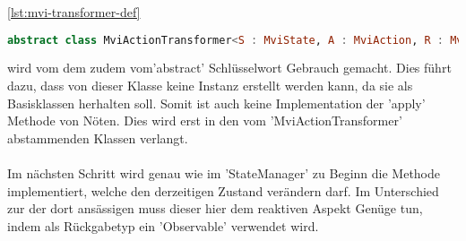 \ref{lst:mvi-transformer-def}
\begin{lstlisting}[caption={MviActionTransformer Definition}, label={lst:mvi-transformer-def},
language=Kotlin]
abstract class MviActionTransformer<S : MviState, A : MviAction, R : MviResult> 
\end{lstlisting}
\bigskip
wird vom dem zudem vom'abstract' Schlüsselwort Gebrauch gemacht. Dies führt dazu, dass von dieser Klasse keine Instanz erstellt werden kann, da sie als Basisklassen herhalten soll. Somit ist auch keine Implementation der 'apply' Methode von Nöten. Dies wird erst in den vom 'MviActionTransformer' abstammenden Klassen verlangt.
\\\\
Im nächsten Schritt wird genau wie im 'StateManager' zu Beginn die Methode implementiert, welche den derzeitigen Zustand verändern darf. Im Unterschied zur der dort ansässigen muss dieser hier dem reaktiven Aspekt Genüge tun, indem als Rückgabetyp ein 'Observable' verwendet wird. 


